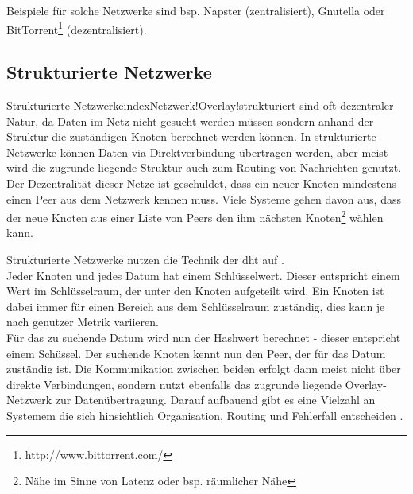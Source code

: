 Beispiele für solche Netzwerke sind bsp. Napster (zentralisiert), Gnutella oder BitTorrent\footnote{http://www.bittorrent.com/} (dezentralisiert).

\subsection{Strukturierte Netzwerke}
Strukturierte Netzwerkeindex{Netzwerk!Overlay!strukturiert} sind oft dezentraler Natur, da Daten im Netz nicht gesucht werden müssen sondern anhand der Struktur die zuständigen Knoten berechnet werden können. In strukturierte Netzwerke können Daten via Direktverbindung übertragen werden, aber meist wird die zugrunde liegende Struktur auch zum Routing von Nachrichten genutzt. Der Dezentralität dieser Netze ist geschuldet, dass ein neuer Knoten mindestens einen Peer aus dem Netzwerk kennen muss. Viele Systeme gehen davon aus, dass der neue Knoten aus einer Liste von Peers den ihm nächsten Knoten\footnote{Nähe im Sinne von Latenz oder bsp. räumlicher Nähe} wählen kann.

Strukturierte Netzwerke nutzen die Technik der \ac{dht} auf \cite{Wehrle2005, Ghodsi2006AlgorithmsDHT}.\\

Jeder Knoten und jedes Datum hat einem Schlüsselwert. Dieser entspricht einem Wert im Schlüsselraum, der unter den Knoten aufgeteilt wird. Ein Knoten ist dabei immer für einen Bereich aus dem Schlüsselraum zuständig, dies kann je nach genutzer Metrik variieren.\\
Für das zu suchende Datum wird nun der Hashwert berechnet - dieser entspricht einem Schüssel. Der suchende Knoten kennt nun den Peer, der für das Datum zuständig ist. Die Kommunikation zwischen beiden erfolgt dann meist nicht über direkte Verbindungen, sondern nutzt ebenfalls das zugrunde liegende Overlay-Netzwerk zur Datenübertragung. Darauf aufbauend gibt es eine Vielzahl an Systemem die sich hinsichtlich Organisation, Routing und Fehlerfall entscheiden \cite{Goetz2005}.








